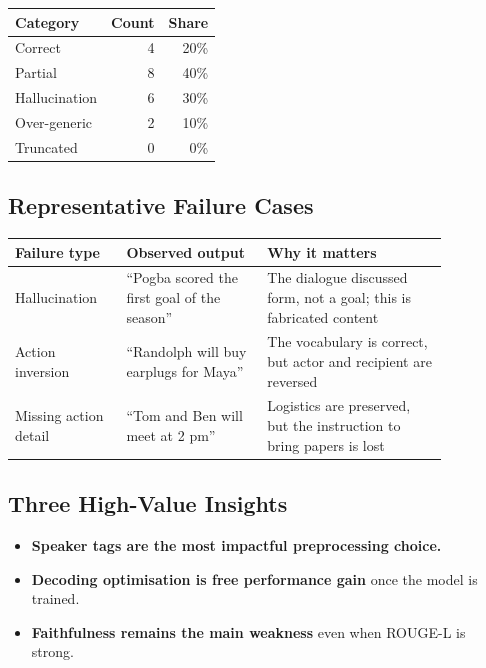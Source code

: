 \documentclass[11pt,a4paper]{article}
\newcommand{\tightitem}{\setlength\itemsep{2pt}\setlength\parskip{0pt}}
\begin{document}
\begin{center}
\begin{tabular}{lrr}
\toprule
Category & Count & Share \\
\midrule
Correct & 4 & 20\% \\
Partial & 8 & 40\% \\
Hallucination & 6 & 30\% \\
Over-generic & 2 & 10\% \\
Truncated & 0 & 0\% \\
\bottomrule
\end{tabular}
\end{center}

\subsection{Representative Failure Cases}

\begin{center}
\small
\begin{tabular}{p{0.22\linewidth}p{0.28\linewidth}p{0.36\linewidth}}
\toprule
\textbf{Failure type} & \textbf{Observed output} & \textbf{Why it matters} \\
\midrule
Hallucination & ``Pogba scored the first goal of the season'' & The dialogue discussed form, not a goal; this is fabricated content \\
Action inversion & ``Randolph will buy earplugs for Maya'' & The vocabulary is correct, but actor and recipient are reversed \\
Missing action detail & ``Tom and Ben will meet at 2 pm'' & Logistics are preserved, but the instruction to bring papers is lost \\
\bottomrule
\end{tabular}
\end{center}

\subsection{Three High-Value Insights}

\begin{itemize}\tightitem
\item \textbf{Speaker tags are the most impactful preprocessing choice.}
\item \textbf{Decoding optimisation is free performance gain} once the model is trained.
\item \textbf{Faithfulness remains the main weakness} even when ROUGE-L is strong.
\end{itemize}
\end{document}
